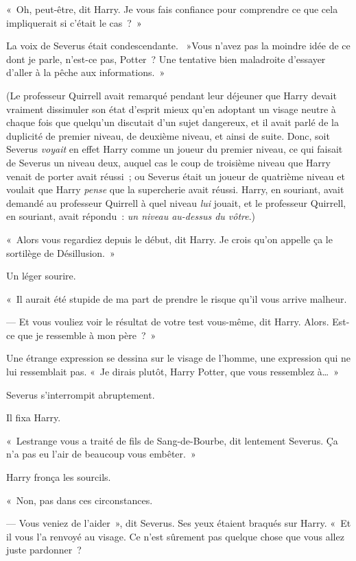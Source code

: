 «~Oh, peut-être, dit Harry. Je vous fais confiance pour comprendre ce que cela impliquerait si c'était le cas~?~»

La voix de Severus était condescendante. ~»Vous n'avez pas la moindre idée de ce dont je parle, n'est-ce pas, Potter~? Une tentative bien maladroite d'essayer d'aller à la pêche aux informations.~»

(Le professeur Quirrell avait remarqué pendant leur déjeuner que Harry devait vraiment dissimuler son état d'esprit mieux qu'en adoptant un visage neutre à chaque fois que quelqu'un discutait d'un sujet dangereux, et il avait parlé de la duplicité de premier niveau, de deuxième niveau, et ainsi de suite. Donc, soit Severus \emph{voyait} en effet Harry comme un joueur du premier niveau, ce qui faisait de Severus un niveau deux, auquel cas le coup de troisième niveau que Harry venait de porter avait réussi~; ou Severus était un joueur de quatrième niveau et voulait que Harry \emph{pense} que la supercherie avait réussi. Harry, en souriant, avait demandé au professeur Quirrell à quel niveau \emph{lui} jouait, et le professeur Quirrell, en souriant, avait répondu~: \emph{un niveau au-dessus du vôtre}.)

«~Alors vous regardiez depuis le début, dit Harry. Je crois qu'on appelle ça le sortilège de Désillusion.~»

Un léger sourire.

«~Il aurait été stupide de ma part de prendre le risque qu'il vous arrive malheur.

--- Et vous vouliez voir le résultat de votre test vous-même, dit Harry. Alors. Est-ce que je ressemble à mon père~?~»

Une étrange expression se dessina sur le visage de l'homme, une expression qui ne lui ressemblait pas. «~Je dirais plutôt, Harry Potter, que vous ressemblez à…~»

Severus s'interrompit abruptement.

Il fixa Harry.

«~Lestrange vous a traité de fils de Sang-de-Bourbe, dit lentement Severus. Ça n'a pas eu l'air de beaucoup vous embêter.~»

Harry fronça les sourcils.

«~Non, pas dans ces circonstances.

--- Vous veniez de l'aider~», dit Severus. Ses yeux étaient braqués sur Harry. «~Et il vous l'a renvoyé au visage. Ce n'est sûrement pas quelque chose que vous allez juste pardonner~?


